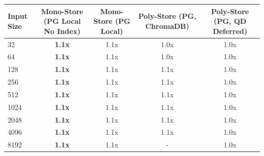 \begin{tabular}{lcccc}
\toprule
\textbf{Input Size} & \textbf{Mono-Store (PG Local No Index)} & \textbf{Mono-Store (PG Local)} & \textbf{Poly-Store (PG, ChromaDB)} & \textbf{Poly-Store (PG, QD Deferred)} \\
\midrule
32 & \textbf{1.1x} & 1.1x & 1.0x & 1.0x \\
64 & \textbf{1.1x} & 1.1x & 1.0x & 1.0x \\
128 & \textbf{1.1x} & 1.1x & 1.1x & 1.0x \\
256 & \textbf{1.1x} & 1.1x & 1.1x & 1.0x \\
512 & \textbf{1.1x} & 1.1x & 1.1x & 1.0x \\
1024 & \textbf{1.1x} & 1.1x & 1.1x & 1.0x \\
2048 & \textbf{1.1x} & 1.1x & 1.1x & 1.0x \\
4096 & \textbf{1.1x} & 1.1x & 1.1x & 1.0x \\
8192 & \textbf{1.1x} & 1.1x & - & 1.0x \\
\bottomrule
\end{tabular}
